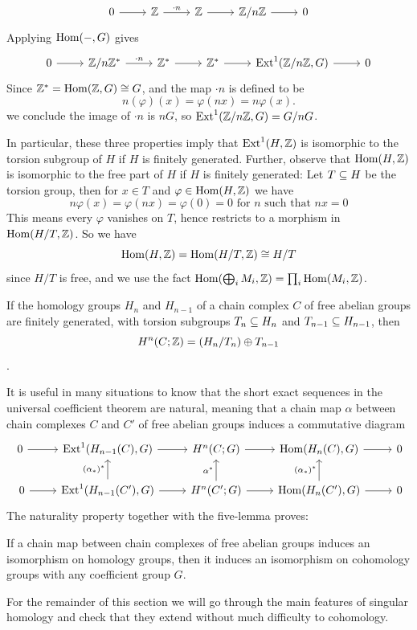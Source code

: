 \[\begin{tikzcd}
0\ar[r]&\Z\ar[r,"\cdot n"]&\Z\ar[r]&\Z/n\Z\ar[r]&0
\end{tikzcd}\]
Applying $\mathrm{Hom}(-,G)$ gives
\[\begin{tikzcd}
0\ar[r]&\Z/n\Z^*\ar[r,"\cdot n"]&\Z^*\ar[r]&\Z^*\ar[r]&\Ext^1(\Z/n\Z,G)\ar[r]&0
\end{tikzcd}\]
Since $\mathbb{Z}^*=\mathrm{Hom}(\mathbb{Z},G)\cong G$, and the map $\cdot n$ is defined to be 
\[n(\varphi)(x)=\varphi(nx)=n\varphi(x).\]
we conclude the image of $\cdot n$ is $nG$, so $\mathrm{Ext}^1(\mathbb{Z}/n\mathbb{Z},G)=G/nG$.\par
In particular, these three properties imply that $\mathrm{Ext}^1(H,\mathbb{Z})$ is isomorphic to the torsion subgroup of $H$ if $H$ is finitely generated. Further, observe that $\mathrm{Hom}(H,\mathbb{Z})$ is isomorphic to the free part of $H$ if $H$ is finitely generated: Let $T\subseteq H$ be the torsion group, then for $x\in T$ and $\varphi\in\mathrm{Hom}(H,\mathbb{Z})$ we have
\[n\varphi(x)=\varphi(nx)=\varphi(0)=0\text{ for $n$ such that $nx=0$}\]
This means every $\varphi$ vanishes on $T$, hence restricts to a morphism in $\mathrm{Hom}(H/T,\mathbb{Z})$. So we have
\[\mathrm{Hom}(H,\mathbb{Z})=\mathrm{Hom}(H/T,\mathbb{Z})\cong H/T\]
since $H/T$ is free, and we use the fact $\mathrm{Hom}(\bigoplus_iM_i,\mathbb{Z})=\prod_i\mathrm{Hom}(M_i,\mathbb{Z})$.
\begin{corollary}
If the homology groups $H_n$ and $H_{n-1}$ of a chain complex $C$ of free abelian groups are finitely generated, with torsion subgroups $T_n\subseteq H_n$ and
$T_{n-1}\subseteq H_{n-1}$, then 
\[H^n(C;\mathbb{Z})=(H_n/T_n)\oplus T_{n-1}\].
\end{corollary}
It is useful in many situations to know that the short exact sequences in the
universal coefficient theorem are natural, meaning that a chain map $\alpha$ between chain complexes $C$ and $C'$ of free abelian groups induces a commutative diagram
\[\begin{tikzcd}
0\ar[r]&\Ext^1(H_{n-1}(C),G)\ar[r]&H^n(C;G)\ar[r]&\Hom(H_{n}(C),G)\ar[r]&0\\
\
0\ar[r]&\Ext^1(H_{n-1}(C'),G)\ar[u,"(\alpha_*)^*"]\ar[r]&H^n(C';G)\ar[r]\ar[u,"\alpha^*"]&\Hom(H_{n}(C'),G)\ar[r]\ar[u,"(\alpha_*)^*"]&0
\end{tikzcd}\]
The naturality property together with the five-lemma proves:
\begin{corollary}\label{iso homo cohomo}
If a chain map between chain complexes of free abelian groups induces an isomorphism on homology groups, then it induces an isomorphism on cohomology
groups with any coefficient group $G$.
\end{corollary}
For the remainder of this section we will go through the main features of singular homology and check that they extend without much difficulty to cohomology.\par
